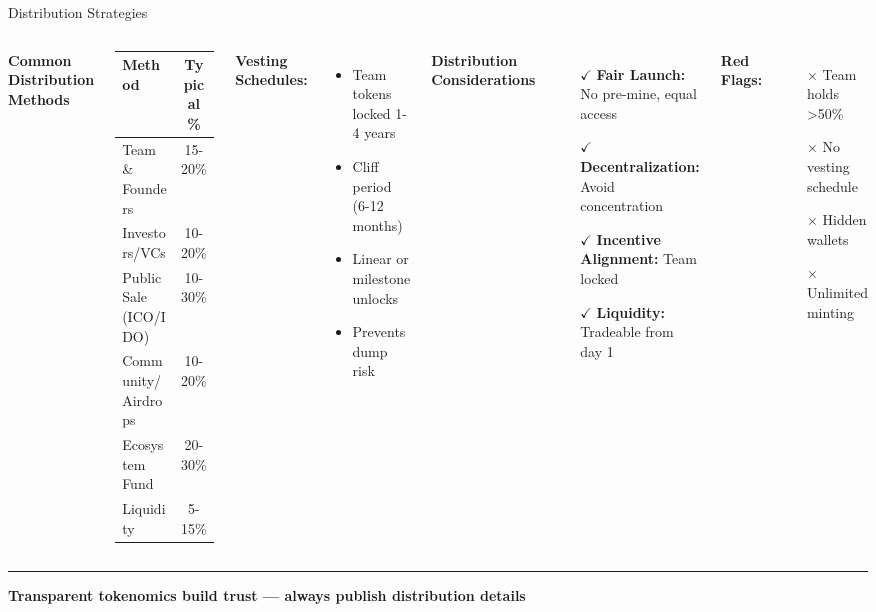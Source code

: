 \documentclass[8pt,aspectratio=169]{beamer}
\newcommand{\bottomnote}[1]{%
\vfill
\vspace{-2mm}
\textcolor{mllavender2}{\rule{\textwidth}{0.4pt}}
\vspace{1mm}
\footnotesize
\textbf{#1}
}
\begin{document}
\begin{frame}[t]{Distribution Strategies}
\begin{columns}[T]
\textbf{Common Distribution Methods}

\begin{tabular}{lc}
\toprule
\textbf{Method} & \textbf{Typical \%} \\
\midrule
Team \& Founders & 15-20\% \\
Investors/VCs & 10-20\% \\
Public Sale (ICO/IDO) & 10-30\% \\
Community/Airdrops & 10-20\% \\
Ecosystem Fund & 20-30\% \\
Liquidity & 5-15\% \\
\bottomrule
\end{tabular}

\vspace{0.5em}
\textbf{Vesting Schedules:}
\begin{itemize}
\item Team tokens locked 1-4 years
\item Cliff period (6-12 months)
\item Linear or milestone unlocks
\item Prevents dump risk
\end{itemize}

\textbf{Distribution Considerations}

\begin{itemize}
\item[\textcolor{mlgreen}{$\checkmark$}] \textbf{Fair Launch:} No pre-mine, equal access
\item[\textcolor{mlgreen}{$\checkmark$}] \textbf{Decentralization:} Avoid concentration
\item[\textcolor{mlgreen}{$\checkmark$}] \textbf{Incentive Alignment:} Team locked
\item[\textcolor{mlgreen}{$\checkmark$}] \textbf{Liquidity:} Tradeable from day 1
\end{itemize}

\vspace{0.5em}
\textbf{Red Flags:}
\begin{itemize}
\item[\textcolor{mlred}{$\times$}] Team holds >50\%
\item[\textcolor{mlred}{$\times$}] No vesting schedule
\item[\textcolor{mlred}{$\times$}] Hidden wallets
\item[\textcolor{mlred}{$\times$}] Unlimited minting
\end{itemize}
\end{columns}

\bottomnote{Transparent tokenomics build trust --- always publish distribution details}
\end{frame}
\end{document}
